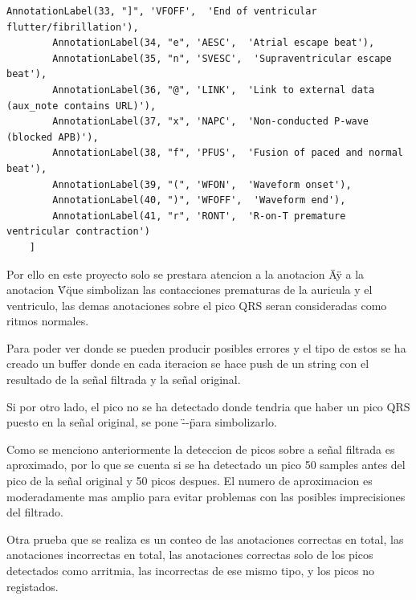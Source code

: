 \begin{lstlisting}[frame=single]
        AnnotationLabel(33, "]", 'VFOFF',  'End of ventricular flutter/fibrillation'),
        AnnotationLabel(34, "e", 'AESC',  'Atrial escape beat'),
        AnnotationLabel(35, "n", 'SVESC',  'Supraventricular escape beat'),
        AnnotationLabel(36, "@", 'LINK',  'Link to external data (aux_note contains URL)'),
        AnnotationLabel(37, "x", 'NAPC',  'Non-conducted P-wave (blocked APB)'),
        AnnotationLabel(38, "f", 'PFUS',  'Fusion of paced and normal beat'),
        AnnotationLabel(39, "(", 'WFON',  'Waveform onset'),
        AnnotationLabel(40, ")", 'WFOFF',  'Waveform end'),
        AnnotationLabel(41, "r", 'RONT',  'R-on-T premature ventricular contraction')
    ]
\end{lstlisting}

Por ello en este proyecto solo se prestara atencion a la anotacion \"A\" y a la anotacion \"V\" que simbolizan 
las contacciones prematuras de la auricula y el ventriculo, las demas anotaciones sobre el pico QRS seran 
consideradas como ritmos normales.

Para poder ver donde se pueden producir posibles errores y el tipo de estos se ha creado un buffer donde en 
cada iteracion se hace push de un string con el resultado de la señal filtrada y la señal original.

Si por otro lado, el pico no se ha detectado donde tendria que haber un pico QRS puesto en la señal original, 
se pone \"--\" para simbolizarlo.

Como se menciono anteriormente la deteccion de picos sobre a señal filtrada es aproximado, por lo que se cuenta
si se ha detectado un pico 50 samples antes del pico de la señal original y 50 picos despues. El numero de aproximacion 
es moderadamente mas amplio para evitar problemas con las posibles imprecisiones del filtrado.  

Otra prueba que se realiza es un conteo de las anotaciones correctas en total, las anotaciones incorrectas en total, las anotaciones
correctas solo de los picos detectados como arritmia, las incorrectas de ese mismo tipo, y los picos no registados. 

